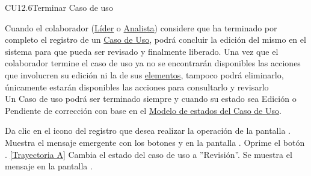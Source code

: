 	\begin{UseCase}{CU12.6}{Terminar Caso de uso}{
			
			Cuando el colaborador (\hyperlink{jefe}{Líder} o \hyperlink{analista}{Analista}) considere que ha terminado por completo el registro de un \hyperlink{casoUso}{Caso de Uso}, podrá concluir la edición del mismo en el sistema para que pueda ser revisado y finalmente liberado.
			Una vez que el colaborador termine el caso de uso ya no se encontrarán disponibles las acciones que involucren su edición ni la de sus \hyperlink{tElemento}{elementos}, tampoco podrá eliminarlo, únicamente estarán disponibles las acciones para consultarlo y revisarlo \\
		
			Un Caso de uso podrá ser terminado siempre y cuando su estado sea Edición o Pendiente de corrección con base en el \hyperlink{edoCU}{Modelo de estados del Caso de Uso}. 
			
	}
	\end{UseCase}
	\begin{UCtrayectoria}
		\UCpaso[\UCactor] Da clic en el icono  del registro que desea realizar la operación de la pantalla .
		\UCpaso[\UCsist] Muestra el mensaje emergente  con los botones  y  en la pantalla .
		\UCpaso[\UCactor] Oprime el botón . \hyperlink{CU12-5:TAA}{[Trayectoria A]}
		\UCpaso[\UCsist] Cambia el estado del caso de uso a ''Revisión''.
		\UCpaso[\UCactor] Se muestra el mensaje  en la pantalla .
	\end{UCtrayectoria}		

